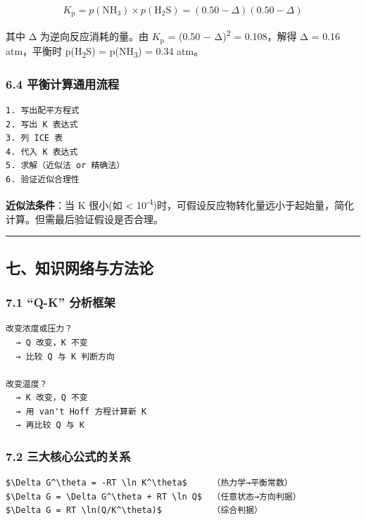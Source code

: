 \documentclass[a4paper,11pt]{ctexart}
\newcommand{\箭}{\ensuremath{\rightarrow}}
\newcommand{\左箭}{\ensuremath{\leftarrow}}
\newcommand{\上箭}{\ensuremath{\uparrow}}
\newcommand{\下箭}{\ensuremath{\downarrow}}
\newcommand{\衡}{\ensuremath{\rightleftharpoons}}
\newcommand{\双箭}{\ensuremath{\leftrightarrow}}
\newcommand{\约等于}{\ensuremath{\approx}}
\newcommand{\小于等于}{\ensuremath{\leq}}
\newcommand{\大于等于}{\ensuremath{\geq}}
\newcommand{\不等于}{\ensuremath{\neq}}
\newcommand{\西格马}{\ensuremath{\sigma}}
\newcommand{\派}{\ensuremath{\pi}}
\begin{document}
\[
K_{\mathrm p} = p(\mathrm{NH_3}) \times p(\mathrm{H_2S}) = (0.50 - \Delta)(0.50 - \Delta)
\]

其中 Δ 为逆向反应消耗的量。由 \(K_{\mathrm p}\) = (0.50 − Δ)\textsuperscript{2} = 0.108，解得 Δ = 0.16 atm，平衡时 p(H\textsubscript{2}S) = p(NH\textsubscript{3}) = 0.34 atm。

\subsubsection{6.4 平衡计算通用流程}\label{ux5e73ux8861ux8ba1ux7b97ux901aux7528ux6d41ux7a0b}

\begin{verbatim}
1. 写出配平方程式
2. 写出 K 表达式
3. 列 ICE 表
4. 代入 K 表达式
5. 求解（近似法 or 精确法）
6. 验证近似合理性
\end{verbatim}

\textbf{近似法条件}：当 K 很小(如 \textless{} 10\textsuperscript{-4})时，可假设反应物转化量远小于起始量，简化计算。但需最后验证假设是否合理。

\begin{center}\rule{0.5\linewidth}{0.5pt}\end{center}

\subsection{七、知识网络与方法论}\label{ux4e03ux77e5ux8bc6ux7f51ux7edcux4e0eux65b9ux6cd5ux8bba}

\subsubsection{7.1 ``Q-K'' 分析框架}\label{q-k-ux5206ux6790ux6846ux67b6}

\begin{verbatim}
改变浓度或压力？
  → Q 改变，K 不变
  → 比较 Q 与 K 判断方向

改变温度？
  → K 改变，Q 不变
  → 用 van't Hoff 方程计算新 K
  → 再比较 Q 与 K
\end{verbatim}

\subsubsection{7.2 三大核心公式的关系}\label{ux4e09ux5927ux6838ux5fc3ux516cux5f0fux7684ux5173ux7cfb}

\begin{verbatim}
$\Delta G^\theta = -RT \ln K^\theta$     （热力学→平衡常数）
$\Delta G = \Delta G^\theta + RT \ln Q$  （任意状态→方向判据）
$\Delta G = RT \ln(Q/K^\theta)$          （综合判据）
\end{verbatim}
\end{document}
